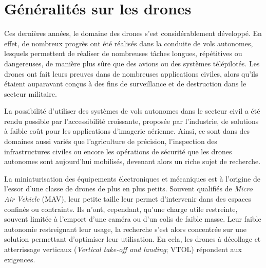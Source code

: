 \chapter{Généralités sur les drones}


Ces dernières années, le domaine des drones s'est considérablement développé. En effet, de nombreux progrès ont été réalisés dans la conduite de vols autonomes, lesquels permettent de réaliser de nombreuses tâches longues, répétitives ou dangereuses, de manière plus sûre que des avions ou des systèmes télépilotés. Les drones ont fait leurs preuves dans de nombreuses applications civiles, alors qu'ils étaient auparavant conçus à des fins de surveillance et de destruction dans le secteur militaire.

La possibilité d'utiliser des systèmes de vols autonomes dans le secteur civil a été rendu possible par l'accessibilité croissante, proposée par l'industrie, de solutions à faible coût pour les applications d'imagerie aérienne. Ainsi, ce sont dans des domaines aussi variés que l'agriculture de précision,  l'inspection des infrastructures civiles ou encore les opérations de sécurité que les drones autonomes sont aujourd'hui mobilisés, devenant alors un riche sujet de recherche.

La miniaturisation des équipements électroniques et mécaniques est à l'origine de l'essor d'une classe de drones de plus en plus petits. Souvent qualifiés de \textit{Micro Air Vehicle} (MAV), leur petite taille leur permet d'intervenir dans des espaces confinés ou contraints. Ils n'ont, cependant, qu'une charge utile restreinte, souvent limitée à l'emport d'une caméra ou d'un colis de faible masse. 
Leur faible autonomie restreignant leur usage, la recherche s'est alors concentrée sur une solution permettant d'optimiser leur utilisation. En cela, les drones à décollage et atterrissage verticaux (\textit{Vertical take-off and landing}; VTOL) répondent aux exigences.

